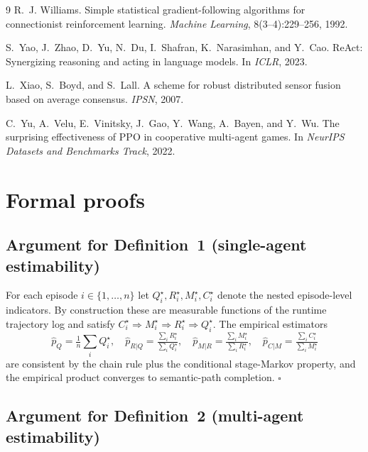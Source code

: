 \documentclass{article}
\begin{document}
{\begin{thebibliography}{9}
R.~J. Williams.
\newblock Simple statistical gradient-following algorithms for connectionist reinforcement learning.
\newblock \emph{Machine Learning}, 8(3--4):229--256, 1992.

S.~Yao, J.~Zhao, D.~Yu, N.~Du, I.~Shafran, K.~Narasimhan, and Y.~Cao.
\newblock ReAct: Synergizing reasoning and acting in language models.
\newblock In \emph{ICLR}, 2023.

L.~Xiao, S.~Boyd, and S.~Lall.
\newblock A scheme for robust distributed sensor fusion based on average consensus.
\newblock \emph{IPSN}, 2007.

C.~Yu, A.~Velu, E.~Vinitsky, J.~Gao, Y.~Wang, A.~Bayen, and Y.~Wu.
\newblock The surprising effectiveness of PPO in cooperative multi-agent games.
\newblock In \emph{NeurIPS Datasets and Benchmarks Track}, 2022.

\end{thebibliography}
}

\appendix

\section{Formal proofs}
\label{app:proofs}

\subsection{Argument for Definition~1 (single-agent estimability)}

For each episode $i \in \{1,\dots,n\}$ let $Q_i^\star, R_i^\star, M_i^\star, C_i^\star$ denote the nested episode-level indicators. By construction these are measurable functions of the runtime trajectory log and satisfy $C_i^\star \Rightarrow M_i^\star \Rightarrow R_i^\star \Rightarrow Q_i^\star$. The empirical estimators
\[
\hat p_Q = \tfrac{1}{n}\sum_i Q_i^\star,\quad
\hat p_{R|Q} = \tfrac{\sum_i R_i^\star}{\sum_i Q_i^\star},\quad
\hat p_{M|R} = \tfrac{\sum_i M_i^\star}{\sum_i R_i^\star},\quad
\hat p_{C|M} = \tfrac{\sum_i C_i^\star}{\sum_i M_i^\star}
\]
are consistent by the chain rule plus the conditional stage-Markov property, and the empirical product converges to semantic-path completion. \hfill$\square$

\subsection{Argument for Definition~2 (multi-agent estimability)}
\end{document}
